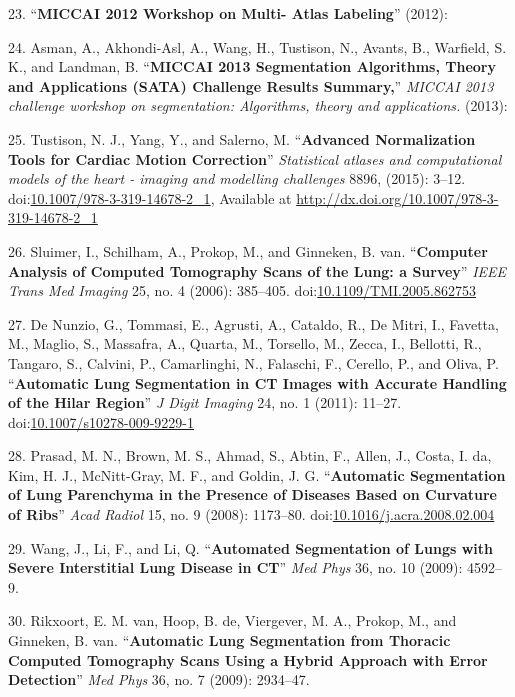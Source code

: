 \documentclass[11pt,]{article}
\begin{document}
23. ``\textbf{MICCAI 2012 Workshop on Multi- Atlas Labeling}'' (2012):

24. Asman, A., Akhondi-Asl, A., Wang, H., Tustison, N., Avants, B.,
Warfield, S. K., and Landman, B. ``\textbf{MICCAI 2013 Segmentation
Algorithms, Theory and Applications (SATA) Challenge Results Summary,}''
\emph{MICCAI 2013 challenge workshop on segmentation: Algorithms, theory
and applications.} (2013):

25. Tustison, N. J., Yang, Y., and Salerno, M. ``\textbf{Advanced
Normalization Tools for Cardiac Motion Correction}'' \emph{Statistical
atlases and computational models of the heart - imaging and modelling
challenges} 8896, (2015): 3--12.
doi:\href{http://dx.doi.org/10.1007/978-3-319-14678-2_1}{10.1007/978-3-319-14678-2\_1},
Available at \url{http://dx.doi.org/10.1007/978-3-319-14678-2_1}

26. Sluimer, I., Schilham, A., Prokop, M., and Ginneken, B. van.
``\textbf{Computer Analysis of Computed Tomography Scans of the Lung: a
Survey}'' \emph{IEEE Trans Med Imaging} 25, no. 4 (2006): 385--405.
doi:\href{http://dx.doi.org/10.1109/TMI.2005.862753}{10.1109/TMI.2005.862753}

27. De Nunzio, G., Tommasi, E., Agrusti, A., Cataldo, R., De Mitri, I.,
Favetta, M., Maglio, S., Massafra, A., Quarta, M., Torsello, M., Zecca,
I., Bellotti, R., Tangaro, S., Calvini, P., Camarlinghi, N., Falaschi,
F., Cerello, P., and Oliva, P. ``\textbf{Automatic Lung Segmentation in
CT Images with Accurate Handling of the Hilar Region}'' \emph{J Digit
Imaging} 24, no. 1 (2011): 11--27.
doi:\href{http://dx.doi.org/10.1007/s10278-009-9229-1}{10.1007/s10278-009-9229-1}

28. Prasad, M. N., Brown, M. S., Ahmad, S., Abtin, F., Allen, J., Costa,
I. da, Kim, H. J., McNitt-Gray, M. F., and Goldin, J. G.
``\textbf{Automatic Segmentation of Lung Parenchyma in the Presence of
Diseases Based on Curvature of Ribs}'' \emph{Acad Radiol} 15, no. 9
(2008): 1173--80.
doi:\href{http://dx.doi.org/10.1016/j.acra.2008.02.004}{10.1016/j.acra.2008.02.004}

29. Wang, J., Li, F., and Li, Q. ``\textbf{Automated Segmentation of
Lungs with Severe Interstitial Lung Disease in CT}'' \emph{Med Phys} 36,
no. 10 (2009): 4592--9.

30. Rikxoort, E. M. van, Hoop, B. de, Viergever, M. A., Prokop, M., and
Ginneken, B. van. ``\textbf{Automatic Lung Segmentation from Thoracic
Computed Tomography Scans Using a Hybrid Approach with Error
Detection}'' \emph{Med Phys} 36, no. 7 (2009): 2934--47.
\end{document}
